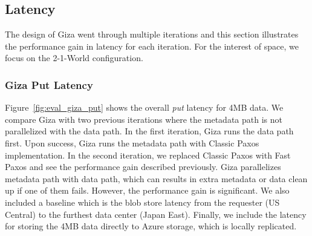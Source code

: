 %


\subsection{\name Latency}

The design of Giza went through multiple iterations and this section illustrates the performance gain in latency for each iteration. For the interest of space, we focus on the 2-1-World configuration.

\subsubsection{Giza Put Latency}


Figure~\ref{fig:eval_giza_put} shows the \name overall {\em put} latency for 4MB data. We compare Giza with two previous iterations where the metadata path is not parallelized with the data path. In the first iteration, Giza runs the data path first. Upon success, Giza runs the metadata path with Classic Paxos implementation. In the second iteration, we replaced Classic Paxos with Fast Paxos and see the performance gain described previously. Giza parallelizes metadata path with data path, which can results in extra metadata or data clean up if one of them fails. However, the performance gain is significant. We also included a baseline which is the blob store latency from the requester (US Central) to the furthest data center (Japan East). Finally, we include the latency for storing the 4MB data directly to Azure storage, which is locally replicated.

